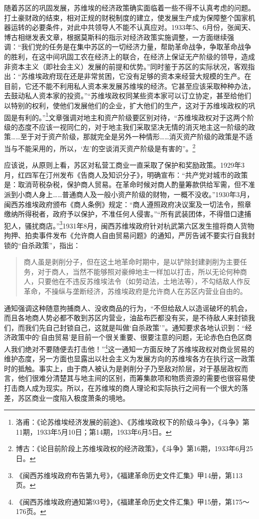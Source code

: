 随着苏区的巩固发展，苏维埃的经济政策确实面临着一些不得不认真考虑的问题。打土豪财政的结束，相对正规的财税制度的建立，使发展生产成为保障整个国家机器运转的必要条件，对此中共领导人不能不认真应对。1933年5、6月份，张闻天、博古相继发表文章，根据莫斯科的指示对经济政策实施调整，一方面继续强调：“我们党的任务是在集中苏区的一切经济力量，帮助革命战争，争取革命战争的胜利，在这中间巩固工农在经济上的联合，在经济上保证无产阶级的领导，造成非资本主义（即社会主义）发展的前提和优势。”同时鉴于苏区的实际状况，客观指出：“苏维埃政府现在还是非常贫困，它没有足够的资本来经营大规模的生产。在目前，它还不能不利用私人资本来发展苏维埃的经济。它甚至应该采取种种办法，去鼓动私人资本家的投资。”“苏维埃政权同某些资本家可以订立协定，甚至给他们以特别的权利，使他们发展他们的企业，扩大他们的生产，这对于苏维埃政权的巩固是有利的。”\footnote{洛甫：《论苏维埃经济发展的前途》、《苏维埃政权下的阶级斗争》，《斗争》第11期，1933年5月10日；第14期，1933年6月5日。}文章强调对地主和资产阶级要区别对待，“苏维埃政权对于这两个阶级的态度不应该一视同仁的，对于地主我们采取坚决无情的消灭地主这一阶级的政策……至于对于资产阶级，那就完全是另外一种情形……消灭资产阶级的政策是不适当与不能采用的，所以，‘左’的空谈消灭资产阶级是有害的”。\footnote{博古：《论目前阶段上苏维埃政权的经济政策》，《斗争》第16期，1933年6月25日。}


应该说，从原则上看，苏区对私营工商业一直采取了保护和奖励政策。1929年3月，红四军在汀州发布《告商人及知识分子》，明确宣布：“共产党对城市的政策是：取消苛税杂税，保护商人贸易。在革命时候对商人酌量筹款供给军需，但不准派到小商人身上……普通商人及一般小资产阶级的财物，一概不没收。”1930年3月，闽西苏维埃政府颁布《商人条例》规定：“商人遵照政府决议案及一切法令，照章缴纳所得税者，政府予以保护，不准任何人侵害。”“所有武装团体，不得借口逮捕犯人，骚扰商店。”\footnote{《闽西苏维埃政府布告第九号》，《福建革命历史文件汇集》甲14册，第113页。}1931年8月，闽西苏维埃政府针对杭武第六区发生擅将商人货物拘押、拍卖事件发布《允许商人自由贸易问题》的通知，严厉告诫不要实行自我封锁的“自杀政策”，指出：

\begin{quote}

商人虽是剥削分子，但在这土地革命时期中，是以铲除封建剥削为主要任务，对于商人，当然不能够照对豪绅地主一样加以打击，所以无论何种商人，只要他在不违反苏维埃法令（如劳动法，土地法等），不勾结敌人作反革命，不操纵与垄断经济，苏维埃政府是允许商人在苏区内营业自由的。
\end{quote}


通知强调这种随意拘捕商人、没收商品的行为，“不但给敌人以造谣破坏的机会，而且各地商人势必都不敢到苏区内营业，油盐布匹都没有买，是不待敌人来封锁我们，而我们先自己封锁自己，这就是叫做‘自杀政策’”。通知要求各地认识到：“经济政策中的‘自由贸易’是目前一个很关重要、很要注意的问题，无论赤色白色区商人我们绝对不要随便去打击他！”\footnote{《闽西苏维埃政府通知第93号》，《福建革命历史文件汇集》甲15册，第175～176页。}这一通知一方面反映了苏维埃政权对商业贸易的维护态度，另一方面也显露出以社会主义为发展方向的苏维埃各方在执行这一政策时的抵触。事实上，由于商人被认为是剥削分子乃至敌对阶层，对于基层政权而言，他们很难分清楚其与地主间的区别，而筹集款项和物质资源的需要也很容易使打击商人成为现实。所以，在苏维埃的商人理论和实际执行之间有一个很大的落差，苏区商业一度陷入极度萧条的境地。


